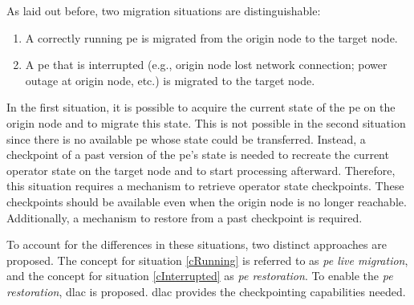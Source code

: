 As laid out before, two migration situations are distinguishable:
\begin{enumerate}
    \item \label{cRunning} A correctly running \gls{pe} is migrated from the origin node to the target node.
    \item \label{cInterrupted} A \gls{pe} that is interrupted (e.g., origin node lost network connection; power outage at origin node, etc.) is migrated to the target node.
\end{enumerate}

In the first situation, it is possible to acquire the current state of the \gls{pe} on the origin node and to migrate this state. This is not possible in the second situation since there is no available \gls{pe} whose state could be transferred. Instead, a checkpoint of a past version of the \gls{pe}'s state is needed to recreate the current operator state on the target node and to start processing afterward. Therefore, this situation requires a mechanism to retrieve operator state checkpoints. These checkpoints should be available even when the origin node is no longer reachable. Additionally, a mechanism to restore from a past checkpoint is required.\par

To account for the differences in these situations, two distinct approaches are proposed. The concept for situation \ref{cRunning} is referred to as \textit{\textit{\acrshort{pe} live migration}}, and the concept for situation \ref{cInterrupted} as \textit{\textit{\acrshort{pe} restoration}}. To enable the \textit{\acrshort{pe} restoration}, \acrfull{dlac} is proposed. \acrshort{dlac} provides the checkpointing capabilities needed.\par

